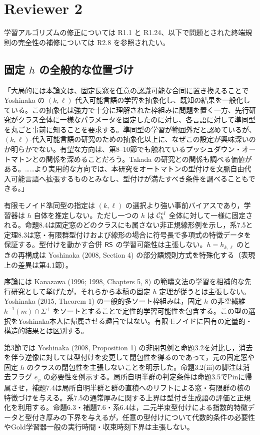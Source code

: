 
\section*{Reviewer 2}
学習アルゴリズムの修正については R1.1 と R1.24、以下で問題とされた終端規則の完全性の補修については R2.8 を参照されたい。

\subsection*{固定 $h$ の全般的な位置づけ}
「大局的には本論文は、固定長窓を任意の認識可能な合同に置き換えることで Yoshinaka の $(k,\ell)$-代入可能言語の学習を抽象化し、既知の結果を一般化している。この抽象化は強力で十分に理解された枠組みに問題を置く一方、先行研究がクラス全体に一様なパラメータを固定したのに対し、各言語に対して準同型を丸ごと事前に知ることを要求する。準同型の学習が範囲外だと認めているが、$(k,\ell)$-代入可能言語の研究のための抽象化以上に、なぜこの設定が興味深いのか明らかでない。有望な方向は、第8--10節でも触れているプッシュダウン・オートマトンとの関係を深めることだろう。Takada の研究との関係も調べる価値がある。……より実用的な方向では、本研究をオートマトンの型付けを文脈自由代入可能言語へ拡張するものとみなし、型付けが満たすべき条件を調べることもできる。」

\Reply
有限モノイド準同型の指定は $(k,\ell)$ の選択より強い事前バイアスであり，学習器は $h$ 自体を推定しない。ただし一つの $h$ は $\mathcal C_h^{\mathrm{cf}}$ 全体に対して一様に固定される。命題8.4は固定窓のどのクラスにも属さない非正規線形例を示し，系7.5と定理8.3は窓・有限群型付けおよび線形の場合に符号長で多項式の特徴データを保証する。型付けを動かす合併 $\mathsf{RS}$ の学習可能性は主張しない。$h=h_{k,\ell}$ のときの再構成は Yoshinaka (2008, Section 4) の部分語規則方式を特殊化する（表現上の差異は第4.1節）。

序論には Kanazawa (1996; 1998, Chapters 5, 8) の範疇文法の学習を相補的な先行研究として挙げたが，それらから本稿の固定 $h$ 定理が従うとは主張しない。Yoshinaka (2015, Theorem 1) の一般的多ソート枠組みは，固定 $h$ の非空繊維 $h^{-1}(m)\cap\Sigma^+$ をソートとすることで定性的学習可能性を包含する。この型の選択をYoshinaka本人に帰属させる趣旨ではない。有限モノイドに固有の定量的・構造的結果とは区別する。

第3節では Yoshinaka (2008, Proposition 1) の非閉包例と命題3.2を対比し，消去を伴う逆像に対しては型付けを変更して閉包性を得るのであって，元の固定窓や固定 $h$ のクラスの閉包性を主張しないことを明示した。命題3.2(iii)の脚注は消去フラグ $e_\varphi$ の必要性を例示する。局所自明半群の判定条件は命題3.5でPinに帰属させ，補題7.4は局所自明半群と群の直積へのリフトによる窓・有限群の核の特徴づけを与える。系7.5の通常厚みに関する上界は型付き生成語の評価と正規化を利用する。命題6.3・補題7.6・系6.4は，二元半束型付けによる指数的特徴データと型付き厚みの下界を与えるが，任意の型付けについて代数的条件の必要性やGold学習器一般の実行時間・収束時刻下界は主張しない。

